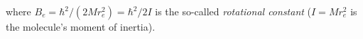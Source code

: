 where $B_e=\hbar^2/(2Mr_e^2)=\hbar^2/2I$ is the so-called \emph{rotational constant} ($I=Mr_e^2$ is the molecule's moment of inertia).
